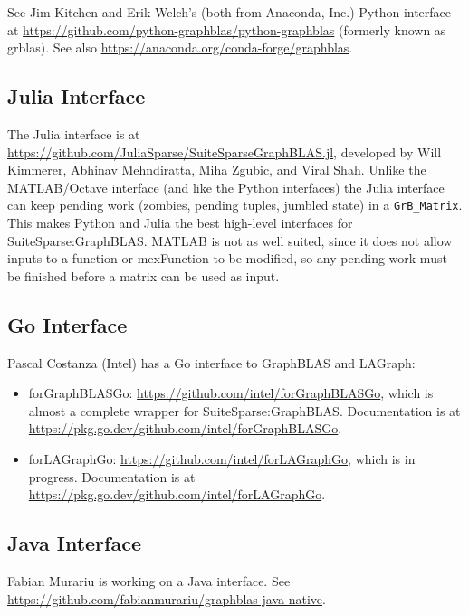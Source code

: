 See Jim Kitchen and Erik Welch's (both from Anaconda, Inc.) Python interface at
\url{https://github.com/python-graphblas/python-graphblas} (formerly known as grblas).
See also \url{https://anaconda.org/conda-forge/graphblas}.

\subsection{Julia Interface}
\label{julia}

The Julia interface is at
\url{https://github.com/JuliaSparse/SuiteSparseGraphBLAS.jl}, developed by Will
Kimmerer, Abhinav Mehndiratta, Miha Zgubic, and Viral Shah.
Unlike the MATLAB/Octave interface (and like the Python interfaces) the Julia
interface can keep pending work (zombies, pending tuples, jumbled state) in
a \verb'GrB_Matrix'. This makes Python and Julia the best high-level interfaces
for SuiteSparse:GraphBLAS.  MATLAB is not as well suited, since it does not
allow inputs to a function or mexFunction to be modified, so any pending
work must be finished before a matrix can be used as input.

\subsection{Go Interface}
\label{go}

Pascal Costanza (Intel) has a Go interface to GraphBLAS and LAGraph:
\begin{itemize}
\item forGraphBLASGo: \url{https://github.com/intel/forGraphBLASGo}, which
is almost a complete wrapper for SuiteSparse:GraphBLAS.
Documentation is at \url{https://pkg.go.dev/github.com/intel/forGraphBLASGo}.
\item forLAGraphGo: \url{https://github.com/intel/forLAGraphGo}, which is in
progress.  Documentation is at
\url{https://pkg.go.dev/github.com/intel/forLAGraphGo}.
\end{itemize}

\subsection{Java Interface}
\label{java}

Fabian Murariu is working on a Java interface.
See \newline
\url{https://github.com/fabianmurariu/graphblas-java-native}.

